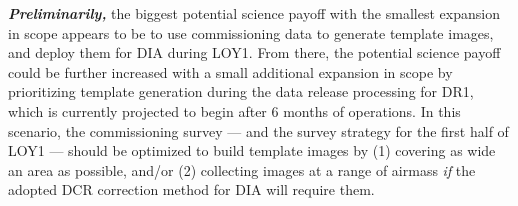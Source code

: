 \documentclass[DM,lsstdraft,toc]{lsstdoc}
\begin{document}
{\bf {\em Preliminarily,}} the biggest potential science payoff with the smallest expansion in scope appears to be to use commissioning data to generate template images, and deploy them for DIA during LOY1. From there, the potential science payoff could be further increased with a small additional expansion in scope by prioritizing template generation during the data release processing for DR1, which is currently projected to begin after 6 months of operations. In this scenario, the commissioning survey --- and the survey strategy for the first half of LOY1 --- should be optimized to build template images by (1) covering as wide an area as possible, and/or (2) collecting images at a range of airmass {\em if} the adopted DCR correction method for DIA will require them.







\end{document}
